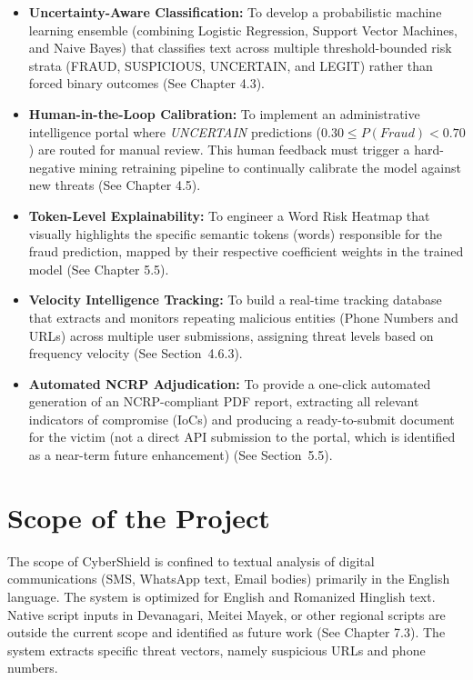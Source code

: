 \begin{itemize}
    \item \textbf{Uncertainty-Aware Classification:} To develop a probabilistic machine learning ensemble (combining Logistic Regression, Support Vector Machines, and Naive Bayes) that classifies text across multiple threshold-bounded risk strata (FRAUD, SUSPICIOUS, UNCERTAIN, and LEGIT) rather than forced binary outcomes (See Chapter 4.3).
    \item \textbf{Human-in-the-Loop Calibration:} To implement an administrative intelligence portal where \textit{UNCERTAIN} predictions ($0.30 \leq P(Fraud) < 0.70$) are routed for manual review. This human feedback must trigger a hard-negative mining retraining pipeline to continually calibrate the model against new threats (See Chapter 4.5).
    \item \textbf{Token-Level Explainability:} To engineer a Word Risk Heatmap that visually highlights the specific semantic tokens (words) responsible for the fraud prediction, mapped by their respective coefficient weights in the trained model (See Chapter 5.5).
    \item \textbf{Velocity Intelligence Tracking:} To build a real-time tracking database that extracts and monitors repeating malicious entities (Phone Numbers and URLs) across multiple user submissions, assigning threat levels based on frequency velocity (See Section~4.6.3).
    \item \textbf{Automated NCRP Adjudication:} To provide a one-click automated generation of an NCRP-compliant PDF report, extracting all relevant indicators of compromise (IoCs) and producing a ready-to-submit document for the victim (not a direct API submission to the portal, which is identified as a near-term future enhancement) (See Section~5.5).
\end{itemize}

\section{Scope of the Project}
The scope of CyberShield is confined to textual analysis of digital communications (SMS, WhatsApp text, Email bodies) primarily in the English language. The system is optimized for English and Romanized Hinglish text. Native script inputs in Devanagari, Meitei Mayek, or other regional scripts are outside the current scope and identified as future work (See Chapter 7.3). The system extracts specific threat vectors, namely suspicious URLs and phone numbers. 

